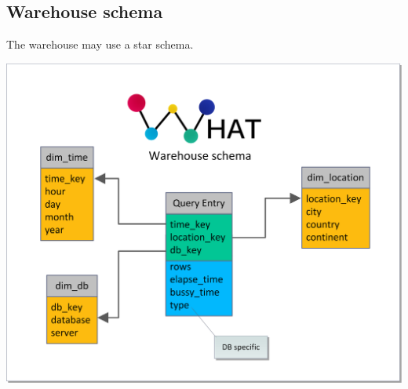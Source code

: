 \subsection{Warehouse schema}
The warehouse may use a star schema.
\begin{center}
\includegraphics[width=1\linewidth]{Pictures/WareHouseSchema.png}
\end{center}   